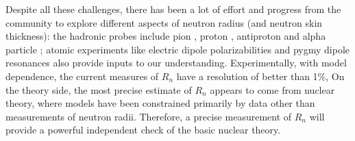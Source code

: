 Despite all these challenges, there has been a lot of effort and progress from the community 
to explore different aspects of neutron radius (and neutron skin thickness): 
the hadronic probes include pion \cite{ALLARDYCE19731}, proton \cite{LOMBARDI1972103,PhysRevC.82.044611}, 
antiproton \cite{PhysRevC.76.014311} and alpha particle \cite{KRASZNAHORKAY2004224};
atomic experiments like electric dipole polarizabilities \cite{Roca_Maza_2012} and 
pygmy dipole resonances \cite{PhysRevC.88.044610}
also provide inputs to our understanding.
Experimentally, with model dependence, the current measures of $R_n$ have a resolution of better than 1\%,
On the theory side, the most precise estimate of $R_n$ appears to come from nuclear theory, 
where models have been constrained primarily by data other than measurements 
of neutron radii. Therefore, a precise measurement of $R_n$ will provide a powerful 
independent check of the basic nuclear theory.
\begin{comment}
\item proton
    \begin{itemize}
	\item high-energy polarized proton
	\item Relativistic Impulse Approximation (RIA) with free nucleon-nucleon interaction
    \end{itemize}
\item pion
    \begin{itemize}
	\item in the $\Delta(1332)$ region, $\pi^- N$ interaction is 3 times larger than $\pi^- p$.
	\item strong absorption at the surface, sensitive to the tail of neutron distributions;
	    increase pion energy to reduce xsection
	\item applicable to only light stable nuclei
    \end{itemize}
\item antiproton
    \begin{itemize}
	\item slow antiproton capture (like an electron)
    \end{itemize}
\item PVES
\item GDR: Giant Dipole Resonance
\item SDR: Spin-Dipole Resonance
\end{comment}

